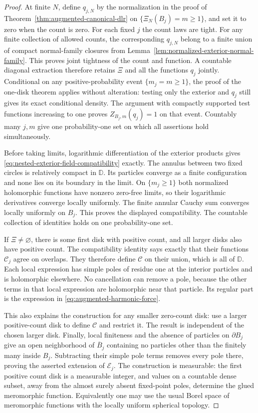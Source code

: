 \documentclass[11pt,a4paper]{article}
\numberwithin{equation}{section}
\theoremstyle{definition}
\theoremstyle{remark}
\newcommand{\D}{\mathbb D}
\begin{document}
\begin{proof}
At finite $N$, define $q_{j,N}$ by the normalization in the proof of
Theorem~\ref{thm:augmented-canonical-dlr} on
$\{\Xi_N(B_j)=m\ge1\}$, and set it to zero when the count is zero.
For each fixed $j$ the count laws are tight. For any finite collection
of allowed counts, the corresponding $q_{j,N}$ belong to a finite
union of compact normal-family closures from
Lemma~\ref{lem:normalized-exterior-normal-family}. This proves joint
tightness of the count and function. A countable diagonal extraction
therefore retains $\Xi$ and all the functions $q_j$ jointly. Conditional
on any positive-probability event $\{m_j=m\ge1\}$, the proof of the
one-disk theorem applies without alteration: testing only the exterior
and $q_j$ still gives its exact conditional density. The argument with
compactly supported test functions increasing to one proves
$Z_{B_j,m}(q_j)=1$ on that event. Countably many $j,m$ give one
probability-one set on which all assertions hold simultaneously.

Before taking limits, logarithmic differentiation of the exterior
products gives \eqref{eq:nested-exterior-field-compatibility} exactly.
The annulus between two fixed circles is relatively compact in $\D$.
Its particles converge as a finite configuration and none lies on its
boundary in the limit. On $\{m_j\ge1\}$ both normalized holomorphic
functions have nonzero zero-free limits, so their logarithmic
derivatives converge locally uniformly. The finite annular Cauchy
sum converges locally uniformly on $B_j$. This proves the displayed
compatibility. The countable collection of identities holds on one
probability-one set.

If $\Xi\ne\varnothing$, there is some first disk with positive count,
and all larger disks also have positive count. The compatibility
identity says exactly that their functions $\mathcal C_j$ agree on
overlaps. They therefore define $\mathcal C$ on their union, which is
all of $\D$. Each local expression has simple poles of residue one
at the interior particles and is holomorphic elsewhere. No
cancellation can remove a pole, because the other terms in that local
expression are holomorphic near that particle. Its regular part is
the expression in \eqref{eq:augmented-harmonic-force}.

This also explains the construction for any smaller zero-count disk:
use a larger positive-count disk to define $\mathcal C$ and restrict
it. The result is independent of the chosen larger disk. Finally,
local finiteness and the absence of particles on $\partial B_j$ give
an open neighborhood of $\overline B_j$ containing no particles other
than the finitely many inside $B_j$. Subtracting their simple pole
terms removes every pole there, proving the asserted extension of
$\mathcal E_j$. The construction is measurable: the first positive
count disk is a measurable integer, and values on a countable dense
subset, away from the almost surely absent fixed-point poles,
determine the glued meromorphic function. Equivalently one may use
the usual Borel space of meromorphic functions with the locally
uniform spherical topology.
\end{proof}
\end{document}
